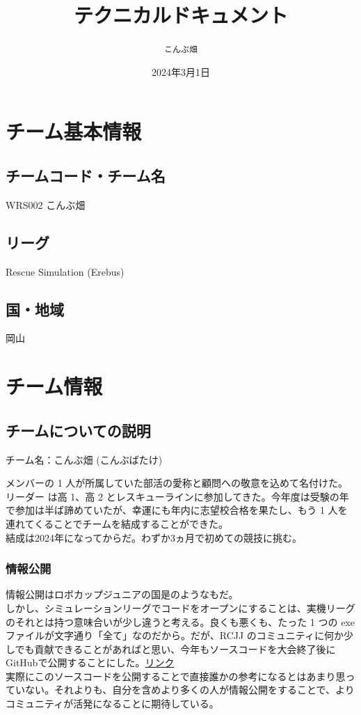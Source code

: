 \documentclass[dvipdfmx,a4paper]{jsarticle}
\title{\vspace{-1cm}テクニカルドキュメント}
\author{\texttt{こんぶ畑}}
\date{2024年3月1日}
\begin{document}
  \maketitle
  \section{チーム基本情報}
    
    \subsection{チームコード・チーム名}
    WRS002 こんぶ畑
    \subsection{リーグ}
    Rescue Simulation (Erebus)
    \subsection{国・地域}
    岡山

  \section{チーム情報}
    \subsection{チームについての説明}
    \noindent
    チーム名：こんぶ畑 (こんぶばたけ)

    \noindent
    メンバーの 1 人が所属していた部活の愛称と顧問への敬意を込めて名付けた。\\
    リーダー は高 1、高 2 とレスキューラインに参加してきた。今年度は受験の年で参加は半ば諦めていたが、幸運にも年内に志望校合格を果たし、もう 1 人を連れてくることでチームを結成することができた。\\
    結成は2024年になってからだ。わずか3ヵ月で初めての競技に挑む。

    \subsubsection{情報公開}
    \noindent
    情報公開はロボカップジュニアの国是のようなもだ。\\
    しかし、シミュレーションリーグでコードをオープンにすることは、実機リーグのそれとは持つ意味合いが少し違うと考える。良くも悪くも、たった 1 つの exe ファイルが文字通り「全て」なのだから。だが、RCJJ のコミュニティに何か少しでも貢献できることがあればと思い、今年もソースコードを大会終了後にGitHubで公開することにした。\href{https://github.com/KOMBU-Batake}{リンク}\\
    実際にこのソースコードを公開することで直接誰かの参考になるとはあまり思っていない。それよりも、自分を含めより多くの人が情報公開をすることで、よりコミュニティが活発になることに期待している。
\end{document}

